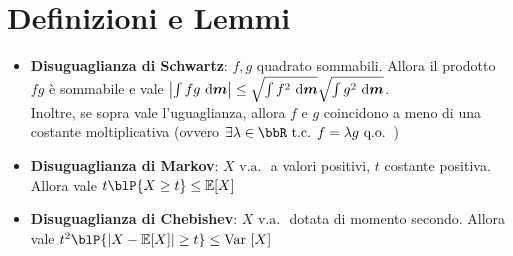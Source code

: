 \documentclass[a4paper, NoNotes, GeneralMath]{stdmdoc}
\newcommand{\E}[1]{\mathbb{E}[{#1}]}
\newcommand{\Var}[1]{\mbox{Var }[{#1}]}
\newcommand{\va}{\mbox{ v.a. }}
\newcommand{\qo}{\mbox{ q.o. }}
\begin{document}
	\section*{Definizioni e Lemmi}
	\begin{itemize}
		\item {\bf Disuguaglianza di Schwartz}: $f,g$ quadrato sommabili. Allora il prodotto $fg$ è sommabile e vale $\left| \int fg \de{\bm{m}} \right| \le \sqrt{\int f^2 \de{\bm{m}}} \sqrt{\int g^2 \de{\bm{m}}}$. \\ Inoltre, se sopra vale l'uguaglianza, allora $f$ e $g$ coincidono a meno di una costante moltiplicativa (ovvero $\exists \lambda \in \bbR \tc f = \lambda g \qo$)
		\item {\bf Disuguaglianza di Markov}: $X \va$ a valori positivi, $t$ costante positiva. Allora vale $t \blP\{X \ge t\} \le \E{X}$
		\item {\bf Disuguaglianza di Chebishev}: $X \va$ dotata di momento secondo. Allora vale $t^2 \blP\{\left| X - \E{X} \right| \ge t \} \le \Var{X}$
		
	\end{itemize}
\end{document}

